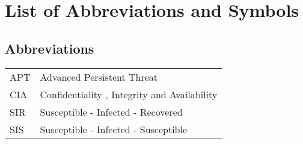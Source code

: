 \documentclass[master=cws, masteroption=vs]{kulemt}
\begin{document}
\begin{abstract*}
\end{abstract*}

\listoffiguresandtables
\chapter{List of Abbreviations and Symbols}
\section*{Abbreviations}
\begin{flushleft}
  \renewcommand{\arraystretch}{1.1}
  \begin{tabularx}{\textwidth}{@{}p{12mm}X@{}}
    APT & Advanced Persistent Threat \\
    CIA & Confidentiality , Integrity and Availability \\
    SIR & Susceptible - Infected - Recovered \\
    SIS & Susceptible - Infected - Susceptible \\
  \end{tabularx}
\end{flushleft}
\end{document}
